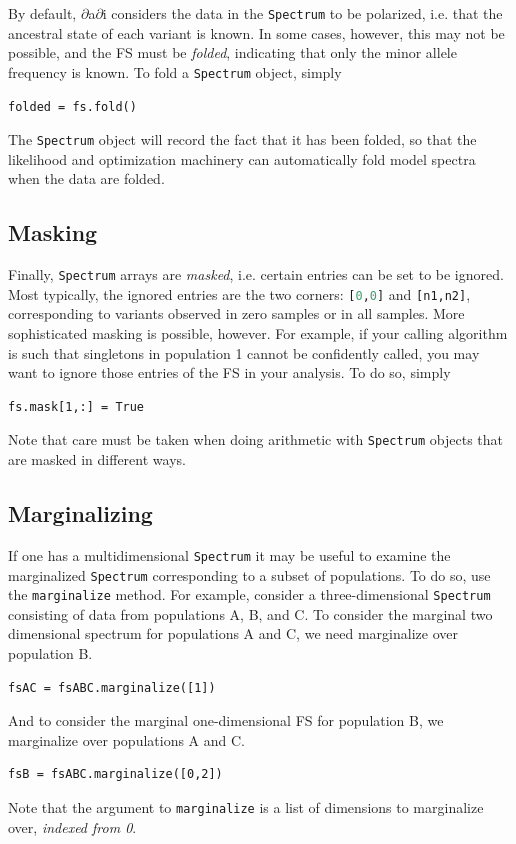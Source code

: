 \documentclass[12pt]{article}
\makeatletter
\newcommand{\dadi}{$\partial$a$\partial$i\xspace}
\newcommand{\py}[1]{\lstinline[language=Python, showstringspaces=False]@#1@}
\makeatother
\begin{document}
By default, \dadi considers the data in the \py{Spectrum} to be polarized, i.e. that the ancestral state of each variant is known.
In some cases, however, this may not be possible, and the FS must be \emph{folded}, indicating that only the minor allele frequency is known.
To fold a \py{Spectrum} object, simply
\begin{lstlisting}
folded = fs.fold()
\end{lstlisting}
The \py{Spectrum} object will record the fact that it has been folded, so that the likelihood and optimization machinery can automatically fold model spectra when the data are folded.

\subsection{Masking}

Finally, \py{Spectrum} arrays are \emph{masked}, i.e. certain entries can be set to be ignored.
Most typically, the ignored entries are the two corners: \py{[0,0]} and \py{[n1,n2]}, corresponding to variants observed in zero samples or in all samples.
More sophisticated masking is possible, however.
For example, if your calling algorithm is such that singletons in population 1 cannot be confidently called, you may want to ignore those entries of the FS in your analysis.
To do so, simply
\begin{lstlisting}
fs.mask[1,:] = True
\end{lstlisting}
Note that care must be taken when doing arithmetic with \py{Spectrum} objects that are masked in different ways.

\subsection{Marginalizing}

If one has a multidimensional \py{Spectrum} it may be useful to examine the marginalized \py{Spectrum} corresponding to a subset of populations.
To do so, use the \py{marginalize} method.
For example, consider a three-dimensional \py{Spectrum} consisting of data from populations A, B, and C.
To consider the marginal two dimensional spectrum for populations A and C, we need marginalize over population B.
\begin{lstlisting}
fsAC = fsABC.marginalize([1])
\end{lstlisting}
And to consider the marginal one-dimensional FS for population B, we marginalize over populations A and C.
\begin{lstlisting}
fsB = fsABC.marginalize([0,2])
\end{lstlisting}
Note that the argument to \py{marginalize} is a list of dimensions to marginalize over, \emph{indexed from 0}.
\end{document}
